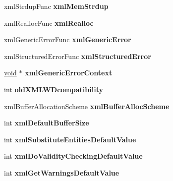 \begin{DoxyCompactItemize}
xml\+Strdup\+Func {\bfseries xml\+Mem\+Strdup}
\item 
\mbox{\label{struct__xml_global_state_afe3342331af0b0563377a7967ba2fa68}} 
xml\+Realloc\+Func {\bfseries xml\+Realloc}
\item 
\mbox{\label{struct__xml_global_state_a68fec3bbfc35f99f7bff04373dbf90c2}} 
xml\+Generic\+Error\+Func {\bfseries xml\+Generic\+Error}
\item 
\mbox{\label{struct__xml_global_state_aef0f8aae9672650f571ccfdb5fe893a1}} 
xml\+Structured\+Error\+Func {\bfseries xml\+Structured\+Error}
\item 
\mbox{\label{struct__xml_global_state_a34d13a95a10b324c97ee524fb25ac0bd}} 
\hyperlink{interfacevoid}{void} $\ast$ {\bfseries xml\+Generic\+Error\+Context}
\item 
\mbox{\label{struct__xml_global_state_a3a4587d5954d544f4ca2234374d3bcd9}} 
int {\bfseries old\+X\+M\+L\+W\+Dcompatibility}
\item 
\mbox{\label{struct__xml_global_state_a4da43ce871efefda1a35b93cf442c553}} 
xml\+Buffer\+Allocation\+Scheme {\bfseries xml\+Buffer\+Alloc\+Scheme}
\item 
\mbox{\label{struct__xml_global_state_abb8a2b0c3484e57154ff709c7c8dc94b}} 
int {\bfseries xml\+Default\+Buffer\+Size}
\item 
\mbox{\label{struct__xml_global_state_a1a0fd78aa36e227f429299a808ea8bee}} 
int {\bfseries xml\+Substitute\+Entities\+Default\+Value}
\item 
\mbox{\label{struct__xml_global_state_ab94304dcd880b0c6f68634fe7fcc60ef}} 
int {\bfseries xml\+Do\+Validity\+Checking\+Default\+Value}
\item 
\mbox{\label{struct__xml_global_state_af4caac50e246cf1f1b6fc0fb9eb7ac83}} 
int {\bfseries xml\+Get\+Warnings\+Default\+Value}
\item 

\end{DoxyCompactItemize}
